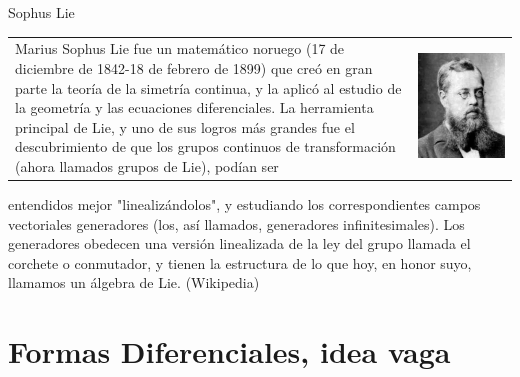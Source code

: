 \documentclass[handout,hyperref={colorlinks=true}]{beamer}
\begin{document}
\begin{frame}{Sophus Lie}
\begin{tabular}{m{0.8\linewidth} >{\centering\arraybackslash}m{0.2\linewidth} }
 
Marius Sophus Lie fue un matemático noruego (17 de diciembre de 1842-18 de febrero de 1899) que creó en gran parte la teoría de la simetría continua, y la aplicó al estudio de la geometría y las ecuaciones diferenciales.
La herramienta principal de Lie, y uno de sus logros más grandes fue el descubrimiento de que los grupos continuos de transformación (ahora llamados grupos de Lie), podían ser

 &

\includegraphics[scale=.25]{imagenes/Sophus_Lie.jpg}
\\
\end{tabular}
 entendidos mejor "linealizándolos", y estudiando los correspondientes campos vectoriales generadores (los, así llamados, generadores infinitesimales). 
Los generadores obedecen una versión linealizada de la ley del grupo llamada el corchete o conmutador, y tienen la estructura de lo que hoy, en honor suyo, llamamos un álgebra de Lie. (Wikipedia)
\end{frame}





\section[Formas]{Formas Diferenciales, idea vaga}
\end{document}
